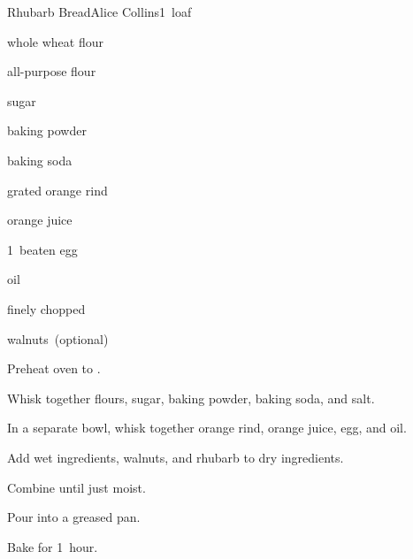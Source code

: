 \begin{recipe}{Rhubarb Bread}{Alice Collins}{1~loaf}

\begin{ingredients}
\item {} whole wheat flour
\item {} all-purpose flour
\item \C{\threequarter} sugar
\item \tp{1\half} baking powder
\item \tp{1\half} baking soda
\item {} grated orange rind
\item \C{\threequarter} orange juice
\item 1~beaten egg
\item {} oil
\item \C{1\half} finely chopped 
\item \C{\half} walnuts~(optional)
\end{ingredients}

\begin{directions}
\item Preheat oven to .
\item Whisk together flours, sugar, baking powder, baking soda, and salt.
\item In a separate bowl, whisk together orange rind, orange juice, egg, and oil.
\item Add wet ingredients, walnuts, and rhubarb to dry ingredients.
\item Combine until just moist.
\item Pour into a greased pan.
\item Bake for 1~hour.
\end{directions}

\end{recipe}
